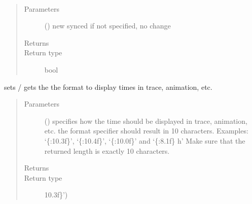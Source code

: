 \documentclass[letterpaper,10pt,english]{sphinxmanual}
\begin{document}
\begin{fulllineitems}

\begin{fulllineitems}
\label{\detokenize{Reference:salabim.Environment.synced}}~\begin{quote}\begin{description}
\item[{Parameters}] \leavevmode
{} () \textendash{} new synced 
if not specified, no change

\item[{Returns}] \leavevmode
{}

\item[{Return type}] \leavevmode
bool

\end{description}\end{quote}

\end{fulllineitems}


\begin{fulllineitems}
\label{\detokenize{Reference:salabim.Environment.time_to_str_format}}
sets / gets the the format to display times in trace, animation, etc.
\begin{quote}\begin{description}
\item[{Parameters}] \leavevmode
{} () \textendash{} specifies how the time should be displayed in trace, animation, etc. 
the format specifier should result in 10 characters. Examples: 
‘\{:10.3f\}’, ‘\{:10.4f\}’, ‘\{:10.0f\}’ and ‘\{:8.1f\} h’ 
Make sure that the returned length is exactly 10 characters.

\item[{Returns}] \leavevmode
{}

\item[{Return type}] \leavevmode
10.3f\}’)

\end{description}\end{quote}


\end{fulllineitems}
\end{fulllineitems}
\end{document}
